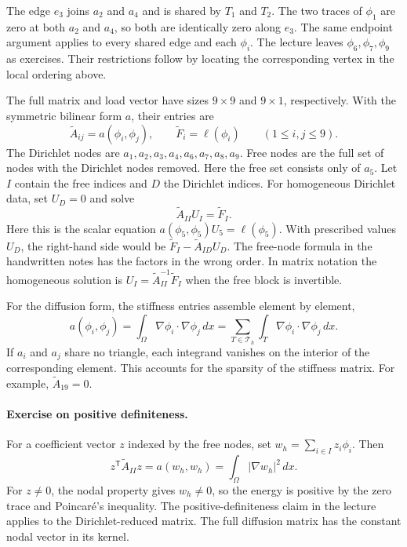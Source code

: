\documentclass[11pt,a4paper]{article}
\begin{document}
The edge \(e_3\) joins \(a_2\) and \(a_4\) and is shared by \(T_1\) and \(T_2\). The two traces of \(\phi_1\) are zero at both \(a_2\) and \(a_4\), so both are identically zero along \(e_3\). The same endpoint argument applies to every shared edge and each \(\phi_i\).
The lecture leaves \(\phi_6,\phi_7,\phi_9\) as exercises. Their restrictions follow by locating the corresponding vertex in the local ordering above.

\smallskip
The full matrix and load vector have sizes \(9\times9\) and \(9\times1\), respectively. With the symmetric bilinear form \(a\), their entries are
\[
 \widetilde A_{ij}=a(\phi_i,\phi_j),
 \qquad \widetilde F_i=\ell(\phi_i)
 \qquad (1\leq i,j\leq9).
\]
The Dirichlet nodes are \(a_1,a_2,a_3,a_4,a_6,a_7,a_8,a_9\). Free nodes are the full set of nodes with the Dirichlet nodes removed. Here the free set consists only of \(a_5\).
Let \(I\) contain the free indices and \(D\) the Dirichlet indices. For homogeneous Dirichlet data, set \(U_D=0\) and solve
\[
 \widetilde A_{II} U_I=\widetilde F_I.
\]
Here this is the scalar equation \(a(\phi_5,\phi_5)U_5=\ell(\phi_5)\).
With prescribed values \(U_D\), the right-hand side would be \(\widetilde F_I-\widetilde A_{ID}U_D\). The free-node formula in the handwritten notes has the factors in the wrong order. In matrix notation the homogeneous solution is \(U_I=\widetilde A_{II}^{-1}\widetilde F_I\) when the free block is invertible.

For the diffusion form, the stiffness entries assemble element by element,
\[
 a(\phi_i,\phi_j)=\int_\Omega\nabla\phi_i\cdot\nabla\phi_j\,dx
   =\sum_{T\in\mathcal T_h}\int_T\nabla\phi_i\cdot\nabla\phi_j\,dx.
\]
If \(a_i\) and \(a_j\) share no triangle, each integrand vanishes on the interior of the corresponding element. This accounts for the sparsity of the stiffness matrix. For example, \(\widetilde A_{19}=0\).

\paragraph{Exercise on positive definiteness.}
For a coefficient vector \(z\) indexed by the free nodes, set \(w_h=\sum_{i\in I}z_i\phi_i\). Then
\[
 z^{\mathsf T}\widetilde A_{II}z=a(w_h,w_h)
    =\int_\Omega|\nabla w_h|^2\,dx .
\]
For \(z\ne0\), the nodal property gives \(w_h\ne0\), so the energy is positive by the zero trace and Poincaré's inequality. The positive-definiteness claim in the lecture applies to the Dirichlet-reduced matrix. The full diffusion matrix has the constant nodal vector in its kernel.
\end{document}
